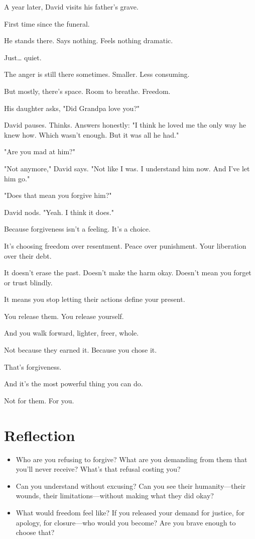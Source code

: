 \documentclass[11pt,twoside]{book}
\begin{document}
A year later, David visits his father's grave.

First time since the funeral.

He stands there. Says nothing. Feels nothing dramatic.

Just\ldots{} quiet.

The anger is still there sometimes. Smaller. Less consuming.

But mostly, there's space. Room to breathe. Freedom.

His daughter asks, "Did Grandpa love you?"

David pauses. Thinks. Answers honestly: "I think he loved me the only way he knew how. Which wasn't enough. But it was all he had."

"Are you mad at him?"

"Not anymore," David says. "Not like I was. I understand him now. And I've let him go."

"Does that mean you forgive him?"

David nods. "Yeah. I think it does."

Because forgiveness isn't a feeling. It's a choice.

It's choosing freedom over resentment. Peace over punishment. Your liberation over their debt.

It doesn't erase the past. Doesn't make the harm okay. Doesn't mean you forget or trust blindly.

It means you stop letting their actions define your present.

You release them. You release yourself.

And you walk forward, lighter, freer, whole.

Not because they earned it. Because you chose it.

That's forgiveness.

And it's the most powerful thing you can do.

Not for them. For you.

\section*{Reflection}

\begin{itemize}
\item Who are you refusing to forgive? What are you demanding from them that you'll never receive? What's that refusal costing you?
\item Can you understand without excusing? Can you see their humanity—their wounds, their limitations—without making what they did okay?
\item What would freedom feel like? If you released your demand for justice, for apology, for closure—who would you become? Are you brave enough to choose that?
\end{itemize}
\end{document}
